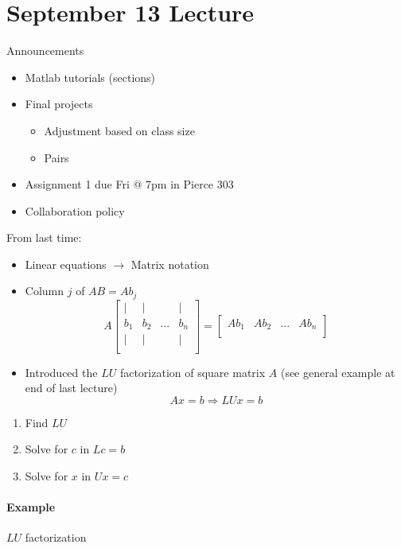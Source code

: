 \section{September 13 Lecture}

Announcements

\begin{itemize}
  \item Matlab tutorials (sections)
  \item Final projects
  \begin{itemize}
    \item Adjustment based on class size
    \item Pairs
  \end{itemize}
  \item Assignment 1 due Fri @ 7pm in Pierce 303
  \item Collaboration policy
\end{itemize}

From last time:

\begin{itemize}
  \item Linear equations $\rightarrow$ Matrix notation
  \item Column $j$ of $AB=Ab_j$
  \[
    A
    \begin{bmatrix}
      | & | &  & | \\
      b_1 & b_2 & ... & b_n \\
      | & | &  & | \\
    \end{bmatrix} = 
    \begin{bmatrix}
      Ab_1 & Ab_2 & ... & Ab_n \\
    \end{bmatrix} 
  \]
  \item Introduced the $LU$ factorization of square matrix $A$ (see general example at end of last lecture)
  \[
    Ax=b \Rightarrow LUx = b
  \]
\end{itemize}

\begin{enumerate}
  \item Find $LU$
  \item Solve for $c$ in $Lc=b$
  \item Solve for $x$ in $Ux=c$
\end{enumerate}

\paragraph{Example} $LU$ factorization

